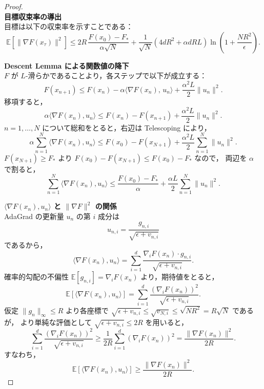 \documentclass[dvipdfmx,a4paper,11pt]{jsarticle}
\begin{document}
\begin{proof}\ \\
\noindent
\textbf{目標収束率の導出}\\
\noindent
目標は以下の収束率を示すことである：
\[
    \mathbb{E}\!\left[\|\nabla F(x_\tau)\|^2\right]
    \leq 2R\,\frac{F(x_0)-F_*}{\alpha\sqrt{N}}
    + \frac{1}{\sqrt{N}}\left(4dR^2 + \alpha dRL\right)
    \ln\!\left(1+\frac{NR^2}{\epsilon}\right).
\]

\noindent
\textbf{Descent Lemma による関数値の降下}\\
\noindent
$F$ が $L$-滑らかであることより，各ステップで以下が成立する：
\[
    F(x_{n+1}) \leq F(x_n) - \alpha\langle \nabla F(x_n),\, u_n \rangle
    + \frac{\alpha^2 L}{2}\|u_n\|^2.
\]
移項すると，
\[
    \alpha\langle \nabla F(x_n), u_n \rangle
    \leq F(x_n) - F(x_{n+1}) + \frac{\alpha^2 L}{2}\|u_n\|^2.
\]
$n = 1, \ldots, N$ について総和をとると，右辺は Telescoping により，
\[
    \alpha \sum_{n=1}^N \langle \nabla F(x_n), u_n \rangle
    \leq F(x_0) - F(x_{N+1}) + \frac{\alpha^2 L}{2}\sum_{n=1}^N \|u_n\|^2.
\]
$F(x_{N+1}) \geq F_*$ より $F(x_0) - F(x_{N+1}) \leq F(x_0) - F_*$ なので，
両辺を $\alpha$ で割ると，
\[
    \sum_{n=1}^N \langle \nabla F(x_n), u_n \rangle
    \leq \frac{F(x_0)-F_*}{\alpha}
    + \frac{\alpha L}{2}\sum_{n=1}^N \|u_n\|^2.
    \tag{A}
\]

\noindent
\textbf{$\langle \nabla F(x_n), u_n \rangle$ と $\|\nabla F\|^2$ の関係}\\
\noindent
AdaGrad の更新量 $u_n$ の第 $i$ 成分は
\[
    u_{n,i} = \frac{g_{n,i}}{\sqrt{\epsilon + v_{n,i}}}
\]
であるから，
\[
    \langle \nabla F(x_n), u_n \rangle
    = \sum_{i=1}^d \frac{\nabla_i F(x_n) \cdot g_{n,i}}{\sqrt{\epsilon+v_{n,i}}}.
\]
確率的勾配の不偏性 $\mathbb{E}[g_{n,i}] = \nabla_i F(x_n)$ より，期待値をとると，
\[
    \mathbb{E}\!\left[\langle \nabla F(x_n), u_n \rangle\right]
    = \sum_{i=1}^d \frac{(\nabla_i F(x_n))^2}{\sqrt{\epsilon+v_{n,i}}}.
\]
仮定 $\|g_n\|_\infty \leq R$ より各座標で $\sqrt{\epsilon + v_{n,i}} \leq \sqrt{v_{N,i}} \leq \sqrt{NR^2} = R\sqrt{N}$ であるが，
より単純な評価として $\sqrt{\epsilon + v_{n,i}} \leq 2R$ を用いると，
\[
    \sum_{i=1}^d \frac{(\nabla_i F(x_n))^2}{\sqrt{\epsilon+v_{n,i}}}
    \geq \frac{1}{2R}\sum_{i=1}^d (\nabla_i F(x_n))^2
    = \frac{\|\nabla F(x_n)\|^2}{2R}.
\]
すなわち，
\[
    \mathbb{E}\!\left[\langle \nabla F(x_n), u_n \rangle\right]
    \geq \frac{\|\nabla F(x_n)\|^2}{2R}.
    \tag{B}
\]


\end{proof}
\end{document}
